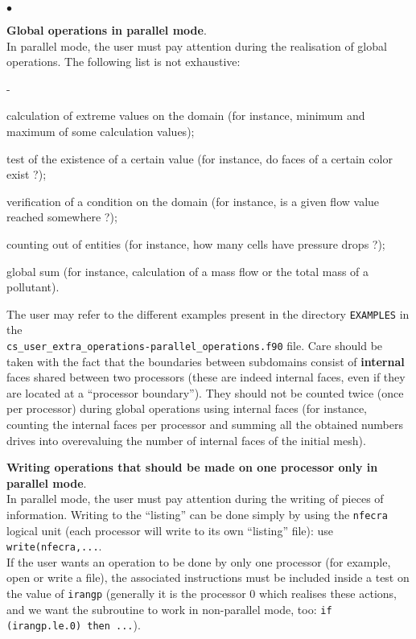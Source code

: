 {{{\begin{list}{$\bullet$}{}
\item {\bf Global operations in parallel mode}.\\
In parallel mode, the user must pay attention during the realisation of
      global operations. The following list is not exhaustive:
        \begin{list}{-}{}
\item calculation of extreme values on the domain (for instance, minimum
      and maximum of some calculation values);
\item test of the existence of a certain value (for instance, do faces
      of a certain color exist ?);
\item verification of a condition on the domain (for instance, is a
      given flow value reached somewhere ?);
\item counting out of entities (for instance, how many cells have
      pressure drops ?);
\item global sum (for instance, calculation of a mass flow or the total
      mass of a pollutant).
      \end{list}
The user may refer to the different examples present in the directory \texttt{EXAMPLES} in the\\
\texttt{cs\_user\_extra\_operations-parallel\_operations.f90} file.
Care should be taken with the fact that the boundaries between
      subdomains consist of {\bf internal} faces shared between
      two processors (these are indeed internal faces, even if they are
      located at a ``processor boundary''). They should not be counted twice
      (once per processor) during global operations using internal faces
      (for instance, counting the internal faces per processor and
      summing all the obtained numbers drives into overevaluing the
      number of internal faces of the initial mesh).

\item {\bf Writing operations that should be made on one
      processor only in parallel mode}.\\
In parallel mode, the user must pay attention during the writing of
      pieces of information. Writing to the ``listing'' can be done
      simply by using the \texttt{nfecra} logical unit (each processor will write
      to its own ``listing'' file): use
      \texttt{write(nfecra,...}. \\
If the user wants an operation to be done by only one processor (for
      example, open or write a file), the associated instructions must
      be included inside a test on the value of \texttt{irangp} (generally it is
      the processor 0 which realises these actions, and we want the
      subroutine to work in non-parallel mode, too: \texttt{if
      (irangp.le.0) then ...}).
\end{list}

}}}
